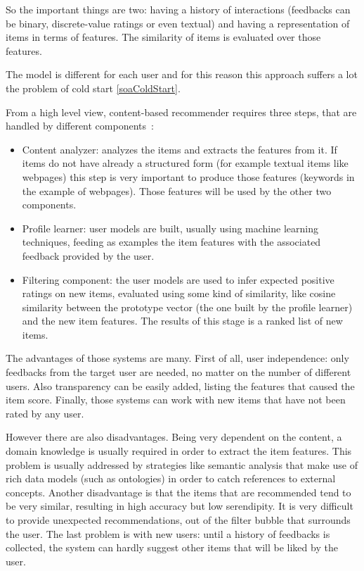 So the important things are two: having a history of interactions (feedbacks can be binary, discrete-value ratings or even textual) and having a representation of items in terms of features. The similarity of items is evaluated over those features.

The model is different for each user and for this reason this approach suffers a lot the problem of cold start \ref{soaColdStart}.

From a high level view, content-based recommender requires three steps, that are handled by different components~\cite{lops2011content}:

\begin{itemize}
	\item Content analyzer: analyzes the items and extracts the features from it. If items do not have already a structured form (for example textual items like webpages) this step is very important to produce those features (keywords in the example of webpages). Those features will be used by the other two components.

	\item Profile learner: user models are built, usually using machine learning techniques, feeding as examples the item features with the associated feedback provided by the user.

	\item Filtering component: the user models are used to infer expected positive ratings on new items, evaluated using some kind of similarity, like cosine similarity between the prototype vector (the one built by the profile learner) and the new item features. The results of this stage is a ranked list of new items.
\end{itemize}

The advantages of those systems are many. First of all, user independence: only feedbacks from the target user are needed, no matter on the number of different users. Also transparency can be easily added, listing the features that caused the item score. Finally, those systems can work with new items that have not been rated by any user.

However there are also disadvantages. Being very dependent on the content, a domain knowledge is usually required in order to extract the item features. This problem is usually addressed by strategies like semantic analysis that make use of rich data models (such as ontologies) in order to catch references to external concepts. Another disadvantage is that the items that are recommended tend to be very similar, resulting in high accuracy but low serendipity. It is very difficult to provide unexpected recommendations, out of the filter bubble that surrounds the user. The last problem is with new users: until a history of feedbacks is collected, the system can hardly suggest other items that will be liked by the user.

